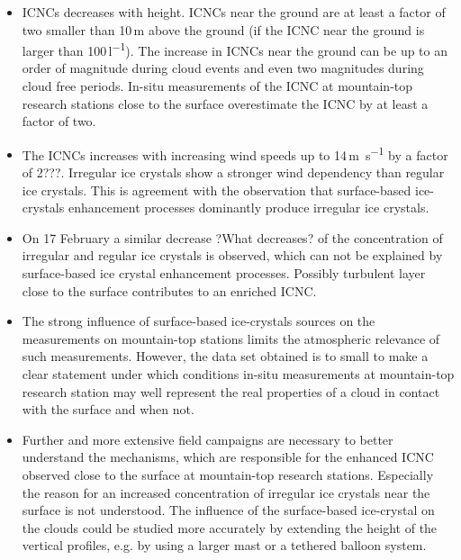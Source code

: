 \documentclass[draft,linenumbers]{agujournal}
\begin{document}
\begin{itemize}
\item ICNCs decreases with height. ICNCs near the ground are at least a factor of two smaller than 10\,\si{m} above the ground (if the ICNC near the ground is larger than 100\,\si{l^{-1}}). The increase in ICNCs near the ground can be up to an order of magnitude during cloud events and even two magnitudes during cloud free periods. In-situ measurements of the ICNC at mountain-top research stations close to the surface overestimate the ICNC by at least a factor of two.
\item The ICNCs increases with increasing wind speeds up to 14\,\si{m s^{-1}} by a factor of 2???. Irregular ice crystals show a stronger wind dependency than regular ice crystals. This is agreement with the observation that surface-based ice-crystals enhancement processes dominantly produce irregular ice crystals.
\item On 17 February a similar decrease ?What decreases? of the concentration of irregular and regular ice crystals is observed, which can not be explained by surface-based ice crystal enhancement processes. Possibly turbulent layer close to the surface contributes to an enriched ICNC.
\item The strong influence of surface-based ice-crystals sources on the measurements on mountain-top stations limits the atmospheric relevance of such measurements. However, the data set obtained is to small to make a clear statement under which conditions in-situ measurements at mountain-top research station may well represent the real properties of a cloud in contact with the surface and when not.
\item Further and more extensive field campaigns are necessary to better understand the mechanisms, which are responsible for the enhanced ICNC observed close to the surface at mountain-top research stations. 
Especially the reason for an increased concentration of irregular ice crystals near the surface is not understood. %
The influence of the surface-based ice-crystal on the clouds could be studied more accurately by extending the height of the vertical profiles, e.g. by using a larger mast or a tethered balloon system.
\end{itemize}
\label{Summary}
\end{document}
